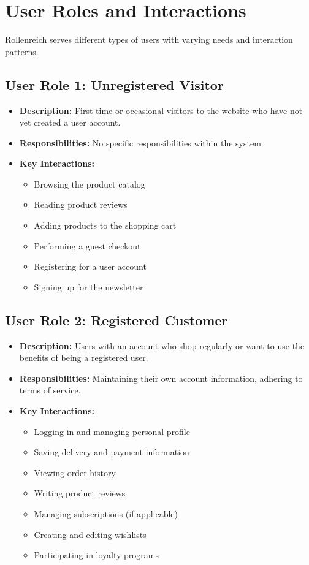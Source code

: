 \documentclass[a4paper,11pt]{article}
\begin{document}
\section{User Roles and Interactions}
Rollenreich serves different types of users with varying needs and interaction patterns.

\subsection{User Role 1: Unregistered Visitor}
\begin{itemize}
    \item \textbf{Description:} First-time or occasional visitors to the website who have not yet created a user account.
    \item \textbf{Responsibilities:} No specific responsibilities within the system.
    \item \textbf{Key Interactions:}
    \begin{itemize}
        \item Browsing the product catalog
        \item Reading product reviews
        \item Adding products to the shopping cart
        \item Performing a guest checkout
        \item Registering for a user account
        \item Signing up for the newsletter
    \end{itemize}
\end{itemize}

\subsection{User Role 2: Registered Customer}
\begin{itemize}
    \item \textbf{Description:} Users with an account who shop regularly or want to use the benefits of being a registered user.
    \item \textbf{Responsibilities:} Maintaining their own account information, adhering to terms of service.
    \item \textbf{Key Interactions:}
    \begin{itemize}
        \item Logging in and managing personal profile
        \item Saving delivery and payment information
        \item Viewing order history
        \item Writing product reviews
        \item Managing subscriptions (if applicable)
        \item Creating and editing wishlists
        \item Participating in loyalty programs
    \end{itemize}
\end{itemize}
\end{document}
